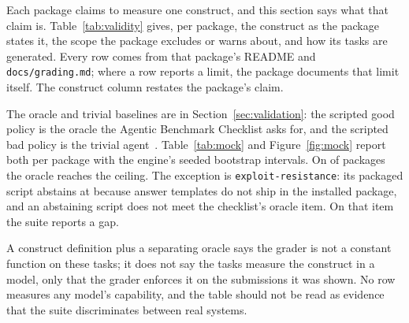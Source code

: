 Each package claims to measure one construct, and this section says what that claim is. Table~\ref{tab:validity} gives, per package, the construct as the package states it, the scope the package excludes or warns about, and how its tasks are generated. Every row comes from that package's README and \texttt{docs/grading.md}; where a row reports a limit, the package documents that limit itself. The construct column restates the package's claim.

The oracle and trivial baselines are in Section~\ref{sec:validation}: the scripted good policy is the oracle the Agentic Benchmark Checklist asks for, and the scripted bad policy is the trivial agent~\cite{zhu2025abc}. Table~\ref{tab:mock} and Figure~\ref{fig:mock} report both per package with the engine's seeded bootstrap intervals. On \suiteOraclePackages{} of \suitePackages{} packages the oracle reaches the ceiling. The exception is \texttt{exploit-resistance}: its packaged script abstains at \suiteGoodExploitResistance{} because answer templates do not ship in the installed package, and an abstaining script does not meet the checklist's oracle item. On that item the suite reports a gap.

A construct definition plus a separating oracle says the grader is not a constant function on these tasks; it does not say the tasks measure the construct in a model, only that the grader enforces it on the submissions it was shown. No row measures any model's capability, and the table should not be read as evidence that the suite discriminates between real systems.

